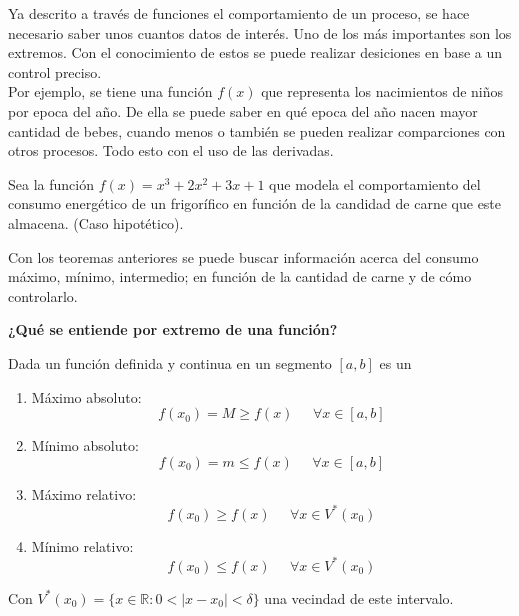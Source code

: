 \documentclass[10pt,twoside]{SelfArx} %
\begin{document}
   Ya descrito a través de funciones el comportamiento de un proceso, se hace necesario saber unos cuantos datos de interés. Uno de los más importantes son los extremos. Con el conocimiento de estos se puede realizar desiciones en base a un control preciso.\\
    Por ejemplo, se tiene una función $ f(x) $ que representa los nacimientos de niños por epoca del año. De ella se puede saber en qué epoca del año nacen mayor cantidad de bebes, cuando menos o también se pueden realizar comparciones con otros procesos. Todo esto con el uso de las derivadas.
   
   
   
   
   
   
%   
\begin{ejemplo}
	Sea la función $ f(x)=x^{3}+2x^{2}+3x+1 $ que modela el comportamiento del consumo energético  de un frigorífico en función de la candidad de carne que este almacena. (Caso hipotético).
\end{ejemplo}	
   Con los teoremas anteriores se puede buscar información acerca del consumo máximo, mínimo, intermedio; en función de la cantidad de carne y de cómo controlarlo.
   \begin{center}
\textbf{   	¿Qué se entiende por extremo de una función?}
   \end{center}
   \begin{thm}
   	Dada un función definida y continua en un segmento $ [a,b] $ es un
   	\begin{enumerate}
   		\item  Máximo absoluto:
   		\[ f(x_{0})=M\geq f(x) \;\;\;\;\; \forall x\in[a,b]\]
   		\item Mínimo absoluto:
   		\[ f(x_{0})=m\leq f(x) \;\;\;\;\; \forall x\in[a,b]\]
   		\item Máximo relativo:
   		\[ f(x_{0})\geq f(x) \;\;\;\;\; \forall x\in V^{*}(x_{0})\]
   		\item Mínimo relativo:
   		\[ f(x_{0})\leq f(x) \;\;\;\;\; \forall x\in V^{*}(x_{0})\]
   	\end{enumerate}
   	Con $ V^{*}(x_{0})=\{x\in \mathbb{R}: 0<|x-x_{0}|<\delta\} $ una vecindad de este intervalo.
   \end{thm}
   
\end{document}
